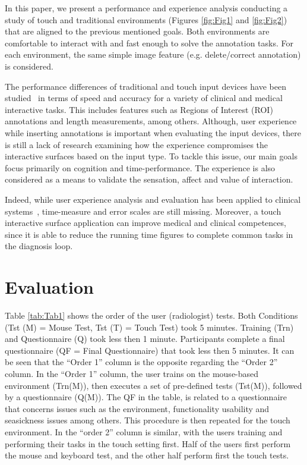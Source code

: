 \documentclass{chi-ext}
\begin{document}
In this paper, we present a performance and experience analysis conducting a study of touch and traditional environments (Figures \ref{fig:Fig1} and \ref{fig:Fig2}) that are aligned to the previous mentioned goals. Both environments are  comfortable to interact with and fast enough to solve the annotation tasks. For each environment, the same simple image feature (e.g. delete/correct annotation) is considered.

The performance differences of traditional and touch input devices have been studied~\cite{watson2013deconstructing} in terms of speed and accuracy for a variety of clinical and medical interactive tasks. This includes features such as Regions of Interest (ROI) annotations and length measurements, among others. Although, user experience while inserting annotations is important when evaluating the input devices, there is still a lack of research examining how the experience compromises the interactive surfaces based on the input type. To tackle this issue, our main goals focus primarily on cognition and time-performance. The experience is also considered as a means to validate the sensation, affect and value of  interaction.

Indeed, while user experience analysis and evaluation has been applied to clinical systems~\cite{crisan2013optimization},  time-measure and error scales are still missing. Moreover, a touch interactive surface application can improve medical and clinical competences, since it is able to reduce the running time figures to complete common tasks in the diagnosis loop.

\section{Evaluation}

Table \ref{tab:Tab1} shows the order of the user (radiologist) tests. Both Conditions (Tst (M) = Mouse Test, Tst (T) = Touch Test) took 5 minutes. Training (Trn) and Questionnaire (Q) took less then 1 minute. Participants complete a final questionnaire (QF = Final Questionnaire) that took less then 5 minutes. It can be seen that the ``Order 1'' column is the opposite regarding the ``Order 2'' column. In the ``Order 1'' column, the user trains on the mouse-based environment (Trn(M)), then executes a set of pre-defined tests (Tst(M)), followed by a questionnaire (Q(M)). The QF in the table, is related to a questionnaire that  concerns issues such as the environment, functionality usability and seasickness issues among others. This procedure is then repeated for the touch environment. In the ``order 2'' column is similar, with the users training and performing their tasks in the touch setting first. Half of the users first perform the mouse and keyboard test, and the other half perform first the touch tests.
\end{document}
